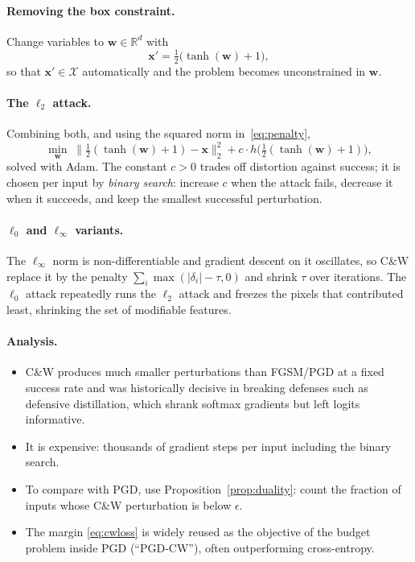 \documentclass[10pt,a4paper]{extarticle}
\theoremstyle{definition}
\newcommand{\R}{\mathbb{R}}
\newcommand{\X}{\mathcal{X}}
\newcommand{\x}{\mathbf{x}}
\newcommand{\xadv}{\mathbf{x}'}
\begin{document}
\paragraph{Removing the box constraint.} Change variables to \(\mathbf{w}\in\R^d\) with
\[
\xadv = \tfrac12\big(\tanh(\mathbf{w})+1\big),
\]
so that \(\xadv\in\X\) automatically and the problem becomes unconstrained in \(\mathbf{w}\).

\paragraph{The \(\ell_2\) attack.} Combining both, and using the squared norm in~\eqref{eq:penalty},
\begin{equation}\label{eq:cwl2}
\min_{\mathbf{w}}\; \big\|\tfrac12(\tanh(\mathbf{w})+1)-\x\big\|_2^2 + c\cdot h\big(\tfrac12(\tanh(\mathbf{w})+1)\big),
\end{equation}
solved with Adam. The constant \(c>0\) trades off distortion against success; it is chosen per input by \emph{binary search}: increase \(c\) when the attack fails, decrease it when it succeeds, and keep the smallest successful perturbation.

\paragraph{\(\ell_0\) and \(\ell_\infty\) variants.} The \(\ell_\infty\) norm is non-differentiable and gradient descent on it oscillates, so C\&W replace it by the penalty \(\sum_i \max(|\delta_i|-\tau,0)\) and shrink \(\tau\) over iterations. The \(\ell_0\) attack repeatedly runs the \(\ell_2\) attack and freezes the pixels that contributed least, shrinking the set of modifiable features.

\paragraph{Analysis.}
\begin{itemize}
  \item C\&W produces much smaller perturbations than FGSM/PGD at a fixed success rate and was historically decisive in breaking defenses such as defensive distillation, which shrank softmax gradients but left logits informative.
  \item It is expensive: thousands of gradient steps per input including the binary search.
  \item To compare with PGD, use Proposition~\ref{prop:duality}: count the fraction of inputs whose C\&W perturbation is below \(\epsilon\).
  \item The margin \eqref{eq:cwloss} is widely reused as the objective of the budget problem inside PGD (\enquote{PGD-CW}), often outperforming cross-entropy.
\end{itemize}
\end{document}
